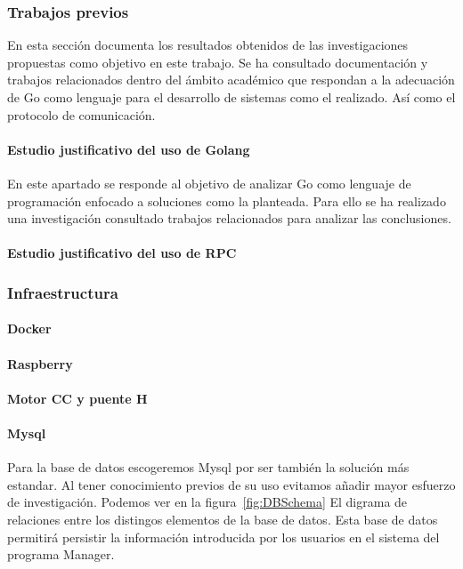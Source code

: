 \subsubsection{Trabajos previos}
    En esta sección documenta los resultados obtenidos de las investigaciones propuestas como objetivo en este trabajo. Se ha consultado documentación y trabajos relacionados dentro del ámbito académico que respondan a la adecuación de Go como lenguaje para el desarrollo de sistemas como el realizado. Así como el protocolo de comunicación.
    \paragraph{Estudio justificativo del uso de Golang}
    En este apartado se responde al objetivo de analizar Go como lenguaje de programación enfocado a soluciones como la planteada. Para ello se ha realizado una investigación consultado trabajos relacionados para analizar las conclusiones.
    
    \paragraph{Estudio justificativo del uso de RPC}
        
\subsubsection{Infraestructura}\label{subsubsec:infraestructura}
    \paragraph{Docker}\label{par:Docker}
        
    \paragraph{Raspberry}
        
    \paragraph{Motor CC y puente H}
        
        
    \paragraph{Mysql}\label{par:mysql}
        Para la base de datos escogeremos Mysql por ser también la solución más estandar. Al tener conocimiento previos de su uso evitamos añadir mayor esfuerzo de investigación. Podemos ver en la figura~\cref{fig:DBSchema} El digrama de relaciones entre los distingos elementos de la base de datos. Esta base de datos permitirá persistir la información introducida por los usuarios en el sistema del programa Manager.\\

